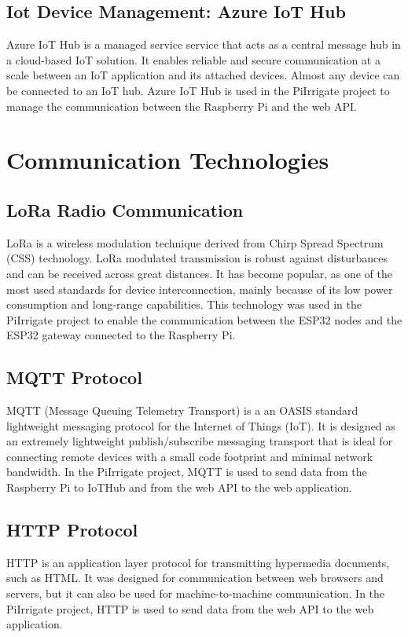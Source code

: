 \subsection{Iot Device Management: Azure IoT Hub}
Azure IoT Hub is a managed service service that acts as a central message hub in a cloud-based IoT solution. It enables reliable and secure
communication at a scale between an IoT application and its attached devices. Almost any device can be connected to an IoT hub\cite{Iothub}.
Azure IoT Hub is used in the PiIrrigate project to manage the
communication between the Raspberry Pi and the web API.

\section{Communication Technologies}
\subsection{LoRa Radio Communication}
LoRa is a wireless modulation technique derived from Chirp Spread Spectrum (CSS) technology.
LoRa modulated transmission is robust against disturbances and can be received across great distances.
It has become popular, as one of the most used standards for device interconnection, mainly because of its
low power consumption and long-range capabilities\cite{lora}. This technology was used in the PiIrrigate project
to enable the communication between the ESP32 nodes and the ESP32 gateway connected to the Raspberry Pi.

\subsection{MQTT Protocol}
MQTT (Message Queuing Telemetry Transport) is a 
an OASIS standard lightweight messaging protocol for the Internet of Things (IoT).
It is designed as an extremely lightweight publish/subscribe messaging transport that is ideal for connecting 
remote devices with a small code footprint and minimal network bandwidth. 
In the PiIrrigate project, MQTT is used to send data from the Raspberry Pi to IoTHub
and from the web API to the web application\cite{mqtt}.

\subsection{HTTP Protocol}
HTTP is an application layer protocol for transmitting hypermedia documents, such as HTML.
It was designed for communication between web browsers and servers, 
but it can also be used for machine-to-machine communication.
In the PiIrrigate project, HTTP is used to send data from the web API to the web application\cite{http}.

